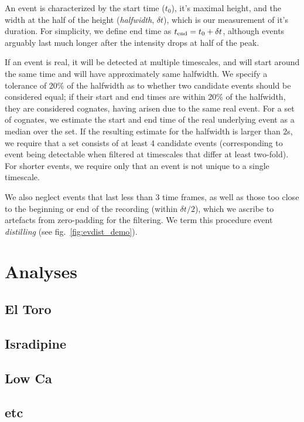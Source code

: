 \documentclass[a4paper,11pt,oneside,]{article}
\begin{document}
An event is characterized by the start time ($t_0$), it's maximal height, and the width at the half of the height ({\it halfwidth}, $\delta t$), which is our measurement of it's duration.
For simplicity, we define end time as $t_{\rm end} = t_0+\delta t$, although events arguably last much longer after the intensity drops at half of the peak.

If an event is real, it will be detected at multiple timescales, and will start around the same time and will have approximately same halfwidth.
We specify a tolerance of 20\% of the halfwidth as to whether two candidate events should be considered equal; if their start and end times are within 20\% of the halfwidth, they are considered cognates, having arisen due to the same real event. 
For a set of cognates, we estimate the start and end time of the real underlying event as a median over the set.
If the resulting estimate for the halfwidth is larger than 2s, we require that a set consists of at least 4 candidate events (corresponding to event being detectable when filtered at timescales that differ at least two-fold).
For shorter events, we require only that an event is not unique to a single timescale.

We also neglect events that last less than $3$ time frames, as well as those too close to the beginning or end of the recording (within $\delta t/2$), which we ascribe to artefacts from zero-padding for the filtering. 
We term this procedure event {\it distilling} (see fig.~\ref{fig:evdist_demo}).





\section{Analyses}
\subsection{El Toro}
\subsection{Isradipine}
\subsection{Low Ca}
\subsection{etc}

\newpage


\end{document}
